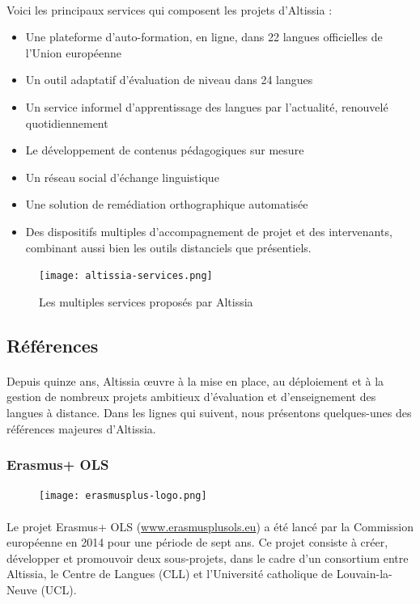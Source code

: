 \paragraph{}
Voici les principaux services qui composent les projets d’Altissia :
\begin{itemize}
    \item Une plateforme d’auto-formation, en ligne, dans 22 langues officielles de l’Union européenne
    \item Un outil adaptatif d’évaluation de niveau dans 24 langues
    \item Un service informel d’apprentissage des langues par l’actualité, renouvelé quotidiennement
    \item Le développement de contenus pédagogiques sur mesure
    \item Un réseau social d’échange linguistique
    \item Une solution de remédiation orthographique automatisée
    \item Des dispositifs multiples d’accompagnement de projet et des intervenants, combinant aussi bien les outils distanciels que présentiels.
\end{itemize}
\begin{figure}[ht]
    \centering
    \texttt{[image: altissia-services.png]}
    \caption{Les multiples services proposés par Altissia}
    \label{fig:altissia-services}
\end{figure}

\subsection{Références}
\paragraph{}
Depuis quinze ans, Altissia œuvre à la mise en place, au déploiement et à la gestion de nombreux projets ambitieux d’évaluation et d’enseignement des langues à distance. Dans les lignes qui suivent, nous présentons quelques-unes des références majeures d’Altissia.

\subsubsection{Erasmus+ OLS}
\begin{figure}
    \centering
    \texttt{[image: erasmusplus-logo.png]}
\end{figure}
\paragraph{}
Le projet Erasmus+ OLS (\url{www.erasmusplusols.eu}) a été lancé par la Commission européenne en 2014 pour une période de sept ans. Ce projet consiste à créer, développer et promouvoir deux sous-projets, dans le cadre d’un consortium entre Altissia, le Centre de Langues (CLL\cite{cll_actualites_nodate}) et l’Université catholique de Louvain-la-Neuve (UCL).
 
